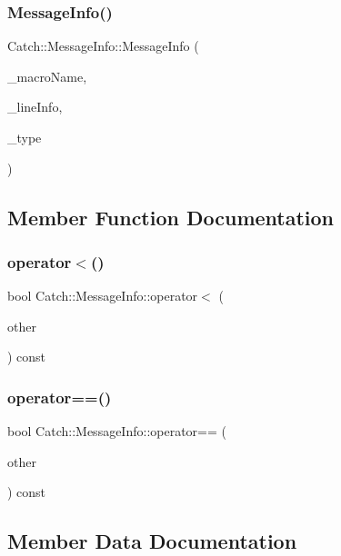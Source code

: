 \subsubsection{MessageInfo()}
{\footnotesize\ttfamily Catch\+::\+Message\+Info\+::\+Message\+Info (\begin{DoxyParamCaption}\item[{\textbf{ String\+Ref} const \&}]{\+\_\+macro\+Name,  }\item[{\textbf{ Source\+Line\+Info} const \&}]{\+\_\+line\+Info,  }\item[{\textbf{ Result\+Was\+::\+Of\+Type}}]{\+\_\+type }\end{DoxyParamCaption})}



\subsection{Member Function Documentation}
\mbox{\label{struct_catch_1_1_message_info_a8254cb8fca2da02a29a9843cdcb79df1}} 
\subsubsection{operator$<$()}
{\footnotesize\ttfamily bool Catch\+::\+Message\+Info\+::operator$<$ (\begin{DoxyParamCaption}\item[{\textbf{ Message\+Info} const \&}]{other }\end{DoxyParamCaption}) const}

\mbox{\label{struct_catch_1_1_message_info_af4b37f2172ba55395813b4bb6bbbde1a}} 
\subsubsection{operator==()}
{\footnotesize\ttfamily bool Catch\+::\+Message\+Info\+::operator== (\begin{DoxyParamCaption}\item[{\textbf{ Message\+Info} const \&}]{other }\end{DoxyParamCaption}) const}



\subsection{Member Data Documentation}
\mbox{\label{struct_catch_1_1_message_info_a250459555d236f9510a5afd78a6c1979}} 
